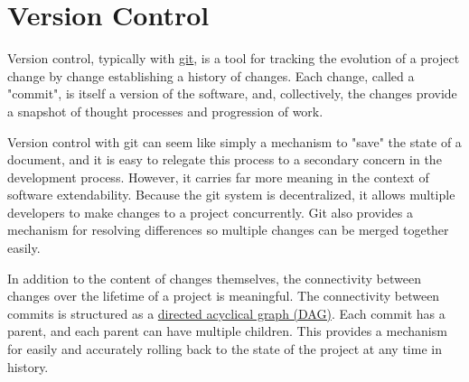 \documentclass[]{nrel}
\begin{document}
\section{Version Control}
\label{sec:version_control}

Version control, typically with \href{https://git-scm.com}{git}, is a tool for tracking the
evolution of a project change by change establishing a history of changes.
Each change, called a "commit", is itself a version of the software, and, collectively,
the changes provide a snapshot of thought processes and progression of work.

Version control with git can seem like simply a mechanism to "save" the state of a document,
and it is easy to relegate this process to a secondary concern in the development process.
However, it carries far more meaning in the context of software extendability.
Because the git system is decentralized, it allows multiple developers to make changes to a
project concurrently.
Git also provides a mechanism for resolving differences so multiple changes can be merged
together easily.

In addition to the content of changes themselves, the connectivity between changes over the
lifetime of a project is meaningful.
The connectivity between commits is structured as a
\href{https://en.wikipedia.org/wiki/Directed\_acyclic\_graph}{directed acyclical graph (DAG)}.
Each commit has a parent, and each parent can have multiple children.
This provides a mechanism for easily and accurately rolling back to the state of the project at any
time in history.
\end{document}
